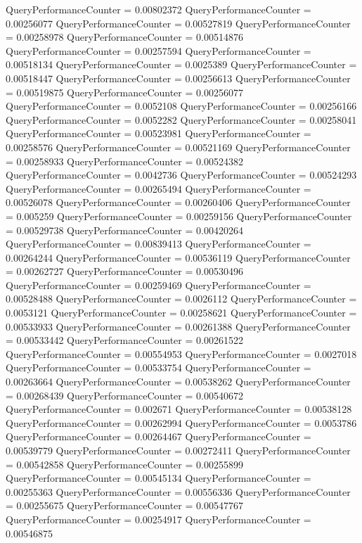 \documentclass[9pt]{article}
\theoremstyle{plain}
\theoremstyle{definition}
\theoremstyle{remark}
\numberwithin{equation}{section}
\begin{document}
QueryPerformanceCounter  =  0.00802372
QueryPerformanceCounter  =  0.00256077
QueryPerformanceCounter  =  0.00527819
QueryPerformanceCounter  =  0.00258978
QueryPerformanceCounter  =  0.00514876
QueryPerformanceCounter  =  0.00257594
QueryPerformanceCounter  =  0.00518134
QueryPerformanceCounter  =  0.0025389
QueryPerformanceCounter  =  0.00518447
QueryPerformanceCounter  =  0.00256613
QueryPerformanceCounter  =  0.00519875
QueryPerformanceCounter  =  0.00256077
QueryPerformanceCounter  =  0.0052108
QueryPerformanceCounter  =  0.00256166
QueryPerformanceCounter  =  0.0052282
QueryPerformanceCounter  =  0.00258041
QueryPerformanceCounter  =  0.00523981
QueryPerformanceCounter  =  0.00258576
QueryPerformanceCounter  =  0.00521169
QueryPerformanceCounter  =  0.00258933
QueryPerformanceCounter  =  0.00524382
QueryPerformanceCounter  =  0.0042736
QueryPerformanceCounter  =  0.00524293
QueryPerformanceCounter  =  0.00265494
QueryPerformanceCounter  =  0.00526078
QueryPerformanceCounter  =  0.00260406
QueryPerformanceCounter  =  0.005259
QueryPerformanceCounter  =  0.00259156
QueryPerformanceCounter  =  0.00529738
QueryPerformanceCounter  =  0.00420264
QueryPerformanceCounter  =  0.00839413
QueryPerformanceCounter  =  0.00264244
QueryPerformanceCounter  =  0.00536119
QueryPerformanceCounter  =  0.00262727
QueryPerformanceCounter  =  0.00530496
QueryPerformanceCounter  =  0.00259469
QueryPerformanceCounter  =  0.00528488
QueryPerformanceCounter  =  0.0026112
QueryPerformanceCounter  =  0.0053121
QueryPerformanceCounter  =  0.00258621
QueryPerformanceCounter  =  0.00533933
QueryPerformanceCounter  =  0.00261388
QueryPerformanceCounter  =  0.00533442
QueryPerformanceCounter  =  0.00261522
QueryPerformanceCounter  =  0.00554953
QueryPerformanceCounter  =  0.0027018
QueryPerformanceCounter  =  0.00533754
QueryPerformanceCounter  =  0.00263664
QueryPerformanceCounter  =  0.00538262
QueryPerformanceCounter  =  0.00268439
QueryPerformanceCounter  =  0.00540672
QueryPerformanceCounter  =  0.002671
QueryPerformanceCounter  =  0.00538128
QueryPerformanceCounter  =  0.00262994
QueryPerformanceCounter  =  0.0053786
QueryPerformanceCounter  =  0.00264467
QueryPerformanceCounter  =  0.00539779
QueryPerformanceCounter  =  0.00272411
QueryPerformanceCounter  =  0.00542858
QueryPerformanceCounter  =  0.00255899
QueryPerformanceCounter  =  0.00545134
QueryPerformanceCounter  =  0.00255363
QueryPerformanceCounter  =  0.00556336
QueryPerformanceCounter  =  0.00255675
QueryPerformanceCounter  =  0.00547767
QueryPerformanceCounter  =  0.00254917
QueryPerformanceCounter  =  0.00546875
\end{document}
